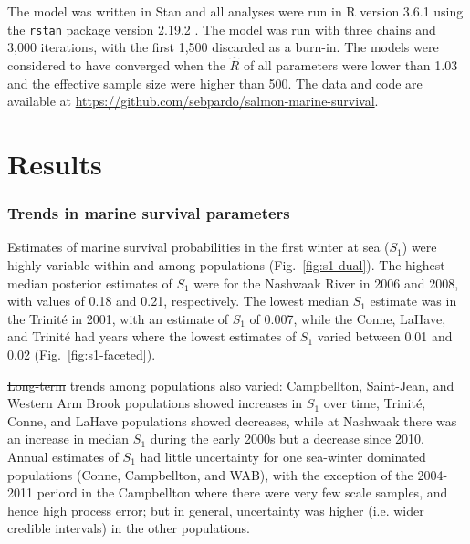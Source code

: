 \documentclass[12pt]{article}
\newcommand{\So}{$S_{1}$\xspace}
\providecommand{\DIFaddtex}[1]{{\protect\color{blue}\uwave{#1}}} %
\providecommand{\DIFdeltex}[1]{{\protect\color{red}\sout{#1}}}                      %
\providecommand{\DIFaddbegin}{} %
\providecommand{\DIFaddend}{} %
\providecommand{\DIFdelbegin}{} %
\providecommand{\DIFdelend}{} %
\providecommand{\DIFadd}[1]{\texorpdfstring{\DIFaddtex{#1}}{#1}} %
\providecommand{\DIFdel}[1]{\texorpdfstring{\DIFdeltex{#1}}{}} %
\begin{document}
The model was written in Stan \citep{Carpenter2017} and all analyses were run in R version 3.6.1
\citep{RCoreTeam2019} using the \texttt{rstan} package version 2.19.2
\citep{StanDevelopmentTeam2019}.
The model was run with three chains and 3,000 iterations, with the first 1,500
discarded as a burn-in. The models were considered to have converged when the
$\hat R$ of all parameters were lower than 1.03 and the effective sample size
were higher than 500. The data and code are available at \url{https://github.com/sebpardo/salmon-marine-survival}.



\section*{Results}


\subsubsection*{Trends in marine survival parameters}

Estimates of marine survival probabilities in the first winter at sea (\So) were
highly variable within and among populations
(Fig.~\ref{fig:s1-dual}). The highest median posterior estimates of \So
were for the Nashwaak River in 2006 and 2008, with values of 0.18 and 0.21,
respectively. The lowest median \So estimate was in the Trinit\'{e} in 2001,
with an estimate of \So of 0.007, while the Conne, LaHave, and Trinit\'{e} had
years where the lowest estimates of \So varied between 0.01 and 0.02 (Fig.~\ref{fig:s1-faceted}).

\DIFdelbegin \DIFdel{Long-term }\DIFdelend \DIFaddbegin \DIFadd{Visual inspection of long-term }\DIFaddend trends among populations also varied: Campbellton,
Saint-Jean, and Western Arm Brook populations showed increases in \So
over time, Trinit\'{e}, Conne, and LaHave populations showed decreases,
while at Nashwaak there was an increase in median \So during the early
2000s but a decrease since 2010. Annual estimates of \So had little
uncertainty for one sea-winter dominated populations (Conne, Campbellton, and
WAB), with the exception of the 2004-2011 periord in the Campbellton where
there were very few scale samples, and hence high process error; but in general,
uncertainty was higher (i.e. wider credible intervals) in the other
populations.
\end{document}
